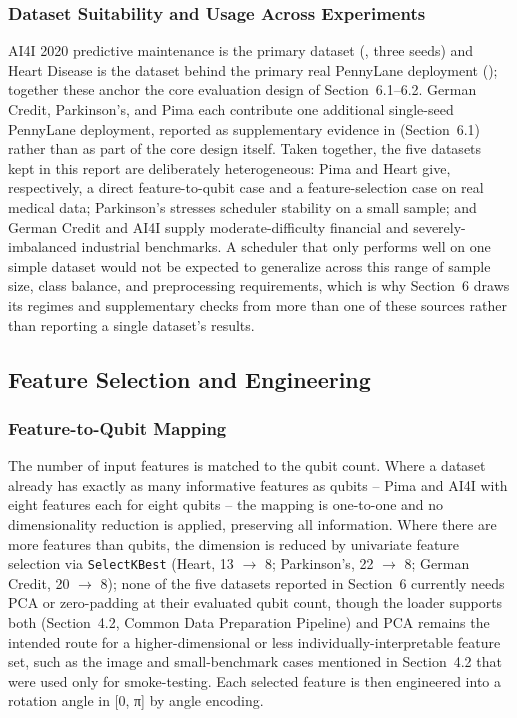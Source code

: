 \subsubsection{Dataset Suitability and Usage Across Experiments}
AI4I 2020 predictive maintenance is the primary dataset (, three seeds) and Heart Disease is the dataset behind the primary real PennyLane deployment (); together these anchor the core evaluation design of Section~6.1--6.2. German Credit, Parkinson's, and Pima each contribute one additional single-seed PennyLane deployment, reported as supplementary evidence in  (Section~6.1) rather than as part of the core design itself. Taken together, the five datasets kept in this report are deliberately heterogeneous: Pima and Heart give, respectively, a direct feature-to-qubit case and a feature-selection case on real medical data; Parkinson's stresses scheduler stability on a small sample; and German Credit and AI4I supply moderate-difficulty financial and severely-imbalanced industrial benchmarks. A scheduler that only performs well on one simple dataset would not be expected to generalize across this range of sample size, class balance, and preprocessing requirements, which is why Section~6 draws its regimes and supplementary checks from more than one of these sources rather than reporting a single dataset's results.

\subsection{Feature Selection and Engineering}

\subsubsection{Feature-to-Qubit Mapping}
The number of input features is matched to the qubit count. Where a dataset already has exactly as many informative features as qubits -- Pima and AI4I with eight features each for eight qubits -- the mapping is one-to-one and no dimensionality reduction is applied, preserving all information. Where there are more features than qubits, the dimension is reduced by univariate feature selection via \texttt{SelectKBest} (Heart, 13 $\rightarrow$ 8; Parkinson's, 22 $\rightarrow$ 8; German Credit, 20 $\rightarrow$ 8); none of the five datasets reported in Section~6 currently needs PCA or zero-padding at their evaluated qubit count, though the loader supports both (Section~4.2, Common Data Preparation Pipeline) and PCA remains the intended route for a higher-dimensional or less individually-interpretable feature set, such as the image and small-benchmark cases mentioned in Section~4.2 that were used only for smoke-testing. Each selected feature is then engineered into a rotation angle in [0, π] by angle encoding.

